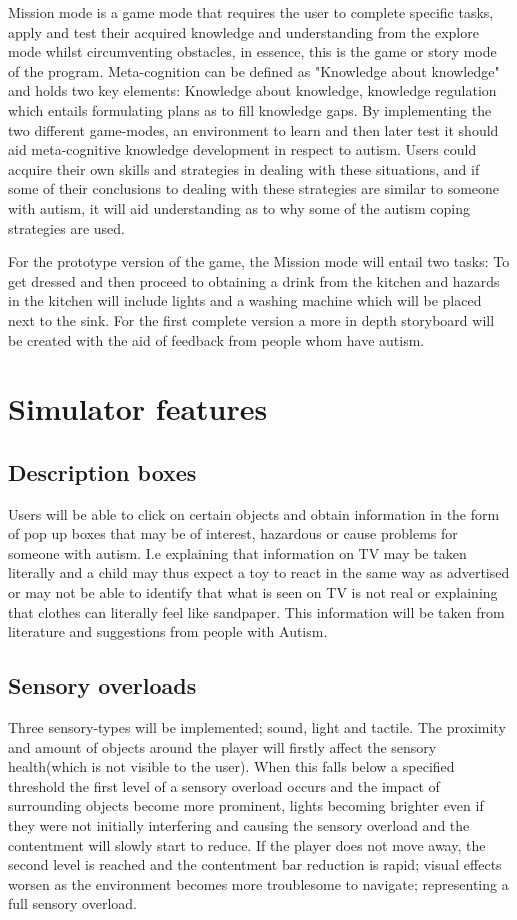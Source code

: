 Mission mode is a game mode that requires the user to complete specific tasks, apply and test their acquired knowledge and understanding from the explore mode whilst circumventing obstacles, in essence, this is the game or story mode of the program. Meta-cognition can be defined as "Knowledge about knowledge" and holds two key elements: Knowledge about knowledge, knowledge regulation which entails formulating plans as to fill knowledge gaps. By implementing the two different game-modes, an environment to learn and then later test it should aid meta-cognitive knowledge development in respect to autism. Users could acquire their own skills and strategies in dealing with these situations, and if some of their conclusions to dealing with these strategies are similar to someone with autism, it will aid understanding as to why some of the autism coping strategies are used.  

For the prototype version of the game, the Mission mode will entail two tasks: To get dressed and then proceed to obtaining a drink from the kitchen and hazards in the kitchen will include lights and a washing machine which will be placed next to the sink. For the first complete version a more in depth storyboard will be created with the aid of feedback from people whom have autism. 

\section{Simulator features}

\subsection{Description boxes}
Users will be able to click on certain objects and obtain information in the form of pop up boxes that may be of interest, hazardous or cause problems for someone with autism. I.e explaining that information on TV may be taken literally and a child may thus expect a toy to react in the same way as advertised or may not be able to identify that what is seen on TV is not real or explaining that clothes can literally feel like sandpaper. This information will be taken from literature and suggestions from people with Autism. 

\subsection{Sensory overloads}
Three sensory-types will be implemented; sound, light and tactile. The proximity and amount of objects around the player will firstly affect the sensory health(which is not visible to the user). When this falls below a specified threshold the first level of a sensory overload occurs and the impact of surrounding objects become more prominent, lights becoming brighter even if they were not initially interfering and causing the sensory overload and the contentment will slowly start to reduce. If the player does not move away, the second level is reached and the contentment bar reduction is rapid; visual effects worsen as the environment becomes more troublesome to navigate; representing a full sensory overload.

